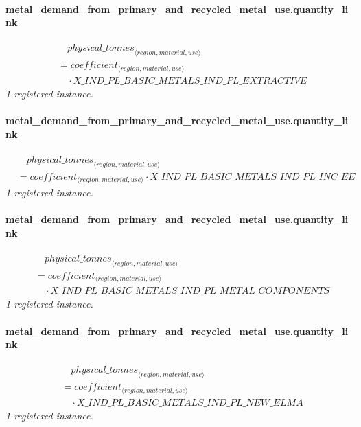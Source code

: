 \documentclass[11pt]{article}
\begin{document}
\paragraph{metal\_demand\_from\_primary\_and\_recycled\_metal\_use.quantity\_link}
\begin{align*}
&\quad {physical\_tonnes}_{\langle region, material, use\rangle}\\
&= coefficient_{\langle region, material, use\rangle}\\
&\quad {}\cdot X\_IND\_PL\_BASIC\_METALS\_IND\_PL\_EXTRACTIVE
\end{align*}
\noindent\emph{1 registered instance.}\par
\paragraph{metal\_demand\_from\_primary\_and\_recycled\_metal\_use.quantity\_link}
\begin{align*}
&\quad {physical\_tonnes}_{\langle region, material, use\rangle}\\
&= coefficient_{\langle region, material, use\rangle} \cdot X\_IND\_PL\_BASIC\_METALS\_IND\_PL\_INC\_EE
\end{align*}
\noindent\emph{1 registered instance.}\par
\paragraph{metal\_demand\_from\_primary\_and\_recycled\_metal\_use.quantity\_link}
\begin{align*}
&\quad {physical\_tonnes}_{\langle region, material, use\rangle}\\
&= coefficient_{\langle region, material, use\rangle}\\
&\quad {}\cdot X\_IND\_PL\_BASIC\_METALS\_IND\_PL\_METAL\_COMPONENTS
\end{align*}
\noindent\emph{1 registered instance.}\par
\paragraph{metal\_demand\_from\_primary\_and\_recycled\_metal\_use.quantity\_link}
\begin{align*}
&\quad {physical\_tonnes}_{\langle region, material, use\rangle}\\
&= coefficient_{\langle region, material, use\rangle}\\
&\quad {}\cdot X\_IND\_PL\_BASIC\_METALS\_IND\_PL\_NEW\_ELMA
\end{align*}
\noindent\emph{1 registered instance.}\par
\end{document}
